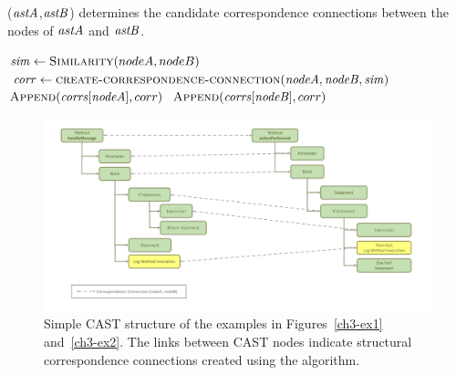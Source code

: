 \begin{algorithm}
  \caption{($\mathit{astA}$,$\mathit{astB}$) determines the candidate correspondence connections between the nodes of $\mathit{astA}$ and $\mathit{astB}$.}
  \label{computeMatches}
  \begin{algorithmic}[1]
  \DeterminePotentialCorrespondences
		
		\State $\mathit{sim} \gets \textsc{Similarity}(nodeA,nodeB)$	
 		\State $\mathit{corr} \gets \textsc{create-correspondence-connection}(\mathit{nodeA},\mathit{nodeB},\mathit{sim})$	
 \State $\textsc{Append}(\mathit{corrs}[\mathit{nodeA}],corr)$	
 \State $\textsc{Append}(\mathit{corrs}[\mathit{nodeB}],corr)$
 		\EndIf 		
 \EndFor 	
	  \EndFor 	
	
  \end{algorithmic}
\end{algorithm}



\begin{figure} [H]  \centering\includegraphics [width = \textwidth]{Drawing4/FirstCorr.pdf}
  \caption[Simple CAST structure of the examples in Figures~\ref{ch3-ex1} and~\ref{ch3-ex2}.]{Simple CAST structure of the examples in Figures~\ref{ch3-ex1} and~\ref{ch3-ex2}. The links between CAST nodes indicate structural correspondence connections created using the  algorithm.}
  \label{fig:meth-ast-1}
\end{figure}

